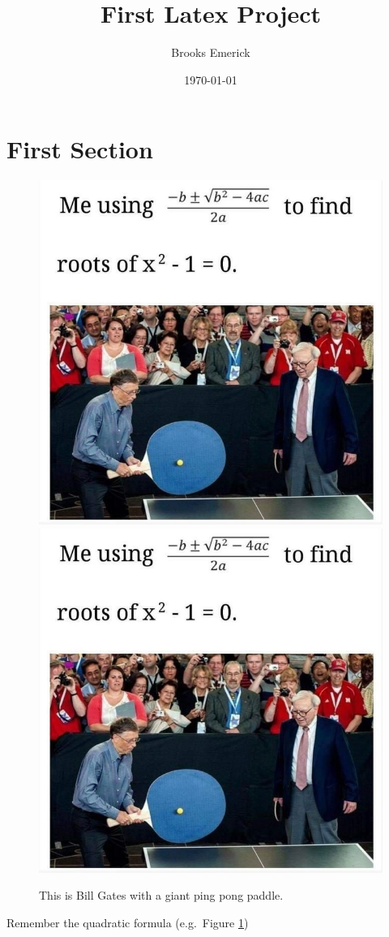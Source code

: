 \documentclass[11pt]{article}
\title{First Latex Project}
\author{Brooks Emerick}
\date{\today}
\begin{document}
\maketitle


\section{First Section}


\begin{figure}[h]

\centering
\includegraphics[width = .45\textwidth]{Figures/Histogram.jpeg}
\includegraphics[width = .45\textwidth]{Figures/Histogram.jpeg}
\caption{This is Bill Gates with a giant ping pong paddle. }
\label{Bill}

\end{figure}


Remember the quadratic formula (e.g.~Figure \ref{Bill})
\end{document}
